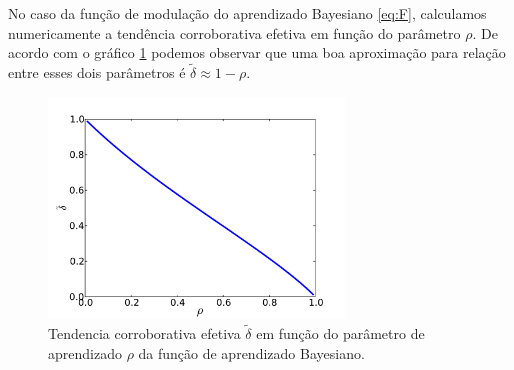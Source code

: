 No caso da função de modulação do aprendizado Bayesiano \ref{eq:F},
calculamos numericamente a tendência corroborativa efetiva em função
do parâmetro $\rho$. De acordo com o gráfico \ref{fig:delta-rho} podemos
observar que uma boa aproximação para relação entre esses dois parâmetros
é $ \tilde \delta \approx 1 - \rho $.
\begin{figure}
    \centering 
    \includegraphics[width=0.7\textwidth]{Figures/delta-rho.pdf}
    \caption{Tendencia corroborativa efetiva $\tilde\delta$ em função do
    parâmetro de aprendizado $\rho$ da função de aprendizado Bayesiano.}
    \label{fig:delta-rho}
\end{figure}


